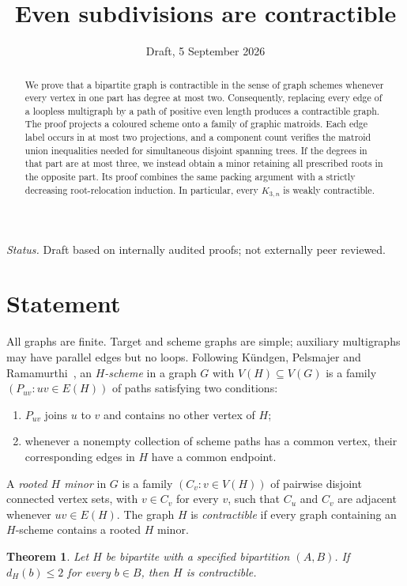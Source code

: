 \documentclass[11pt]{amsart}
\title[Even subdivisions are contractible]{Even subdivisions are contractible}
\date{Draft, 5 September 2026}
\newtheorem{theorem}{Theorem}[section]
\begin{document}
\begin{abstract}
We prove that a bipartite graph is contractible in the sense of graph
schemes whenever every vertex in one part has degree at most two.
Consequently, replacing every edge of a loopless multigraph by a path of
positive even length produces a contractible graph. The proof projects a
coloured scheme onto a family of graphic matroids. Each edge label occurs
in at most two projections, and a component count verifies the matroid
union inequalities needed for simultaneous disjoint spanning trees.
If the degrees in that part are at most three, we instead obtain a minor
retaining all prescribed roots in the opposite part. Its proof combines
the same packing argument with a strictly decreasing root-relocation
induction. In particular, every $K_{3,n}$ is weakly contractible.
\end{abstract}
\maketitle

\noindent\textit{Status.} Draft based on internally audited proofs;
not externally peer reviewed.

\section{Statement}

All graphs are finite. Target and scheme graphs are simple; auxiliary
multigraphs may have parallel edges but no loops. Following
K\"undgen, Pelsmajer and Ramamurthi~\cite[Definitions 1.1 and 2.1]{KPR},
an \emph{$H$-scheme} in a graph $G$ with $V(H)\subseteq V(G)$ is a family
$(P_{uv}:uv\in E(H))$ of paths satisfying two conditions:
\begin{enumerate}
\item $P_{uv}$ joins $u$ to $v$ and contains no other vertex of $H$;
\item whenever a nonempty collection of scheme paths has a common vertex,
their corresponding edges in $H$ have a common endpoint.
\end{enumerate}
A \emph{rooted $H$ minor} in $G$ is a family $(C_v:v\in V(H))$ of
pairwise disjoint connected vertex sets, with $v\in C_v$ for every $v$,
such that $C_u$ and $C_v$ are adjacent whenever $uv\in E(H)$.
The graph $H$ is \emph{contractible} if every graph containing an
$H$-scheme contains a rooted $H$ minor.

\begin{theorem}\label{thm:main}
Let $H$ be bipartite with a specified bipartition $(A,B)$.
If $d_H(b)\leq2$ for every $b\in B$, then $H$ is contractible.
\end{theorem}
\end{document}

